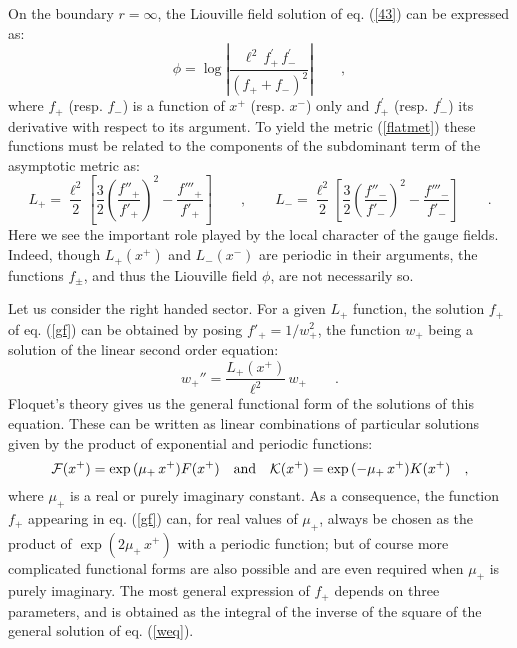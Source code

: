 \documentclass[a4paper,10pt]{article}
\begin{document}
On the boundary $r=\infty$, the Liouville field solution of 
eq. (\ref{43}) can be expressed as:
\begin{equation}
\phi= \log \left \vert \frac {\ell^2 \,  f^{\prime}_+ \,  f^{\prime}_-}
{(f_++ f_-)^2} \right \vert \qquad ,
\end{equation}
where $f_+$ (resp. $ f_-$) is a function of $x^+$ (resp. $x^-$) only and $
f^{\prime}_+$ (resp. $ f^{\prime}_- $) its derivative with respect to its
argument. 
To yield the metric (\ref{flatmet}) these functions 
must be related to the components of the subdominant term of the asymptotic
metric as:
\begin{equation}
\label{gf}
L_+= \frac {\ell^2} 2 \left [
\frac 3 2 \left ( \frac {f''_+}{ f'_+} \right ) ^2
-  \frac { f'''_+}{ f'_+} \right ] \qquad , \qquad 
L_-= \frac {\ell^2} 2 \left [
\frac 3 2 \left ( \frac {f''_-}{ f'_-} \right ) ^2
-  \frac { f'''_-}{ f'_-} \right ] \qquad .
\end{equation}
Here we see the important role played by the local character of
the gauge fields. Indeed,
though $L_+(x^+)$ and $L_-(x^-)$ are periodic in their arguments,
the functions $f_\pm$, and thus the Liouville field $\phi$, 
are not necessarily so. 

Let us consider the right handed
sector. For a given $L_+$ function,
the solution $f_+$ of eq. (\ref{gf}) can be obtained 
by posing $f'_+ = 1/w_+^2$,
the function $w_+$ being a solution of the linear second order equation:
\begin{equation}
w_+''=\frac{L_+(x^+)} {\ell ^2}\, w_+ \qquad . \label{weq}
\end{equation}
Floquet's theory \cite[sec. {\bf 19.4}]{WW} gives us the general 
functional
form of the solutions of this equation. These 
can be written as linear combinations of 
particular solutions given by the product of 
exponential and periodic functions:
\begin{equation}
\label{EXPER}
{\cal F}(x^+)=\exp{(\mu_+\, x^+)}F(x^+)  \quad {\rm and} \quad 
{\cal K}(x^+)=\exp {(-\mu_+\, x^+)} K(x^+) 
\quad  , 
\end{equation}
where $\mu_+$ is a real or purely imaginary constant. 
As a consequence,
 the function $f_+$ 
appearing in  eq. (\ref{gf}) can, for real values of $\mu_+$,
 always be chosen as the product of
$\exp{(2\mu_+\,x^+)}$ with a periodic function; but of course more
 complicated functional
forms are also possible and are even
required when $\mu_+$ is purely imaginary. 
The most general expression of $f_+$ depends on
three parameters, and is obtained as the integral of the inverse of the square
of the general solution of eq. (\ref{weq}).
\end{document}
